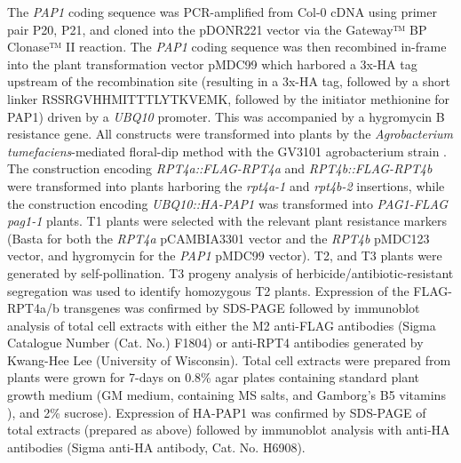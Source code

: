 The \textit{PAP1} coding sequence was PCR-amplified from Col-0 cDNA using primer pair P20, P21, and cloned into the pDONR221 vector via the Gateway™ BP Clonase™ II reaction. The \textit{PAP1} coding sequence was then recombined in-frame into the plant transformation vector pMDC99 which harbored a 3x-HA tag upstream of the recombination site (resulting in a 3x-HA tag, followed by a short linker RSSRGVHHMITTTLYTKVEMK, followed by the initiator methionine for PAP1) driven by a \textit{UBQ10} promoter. This was accompanied by a hygromycin B resistance gene. All constructs were transformed into plants by the \textit{Agrobacterium tumefaciens}-mediated floral-dip method with the GV3101 agrobacterium strain \citep{clough98, gelvin03, zhang06}. The construction encoding \textit{RPT4a::FLAG-RPT4a} and \textit{RPT4b::FLAG-RPT4b} were transformed into plants harboring the \textit{rpt4a-1} and \textit{rpt4b-2} insertions, while the construction encoding \textit{UBQ10::HA-PAP1} was transformed into \textit{PAG1-FLAG pag1-1} plants. T1 plants were selected with the relevant plant resistance markers (Basta for both the \textit{RPT4a} pCAMBIA3301 vector and the \textit{RPT4b} pMDC123 vector, and hygromycin for the \textit{PAP1} pMDC99 vector). T2, and T3 plants were generated by self-pollination. T3 progeny analysis of herbicide/antibiotic-resistant segregation was used to identify homozygous T2 plants. Expression of the FLAG-RPT4a/b transgenes was confirmed by SDS-PAGE followed by immunoblot analysis of total cell extracts with either the M2 anti-FLAG antibodies (Sigma Catalogue Number (Cat. No.) F1804) or anti-RPT4 antibodies generated by Kwang-Hee Lee (University of Wisconsin). Total cell extracts were prepared from plants were grown for 7-days on 0.8\% agar plates containing standard plant growth medium (GM medium, containing MS salts, and Gamborg’s B5 vitamins \citep{gamborg68, julio06, murashige62}), and 2\% sucrose). Expression of HA-PAP1 was confirmed by SDS-PAGE of total extracts (prepared as above) followed by immunoblot analysis with anti-HA antibodies (Sigma anti-HA antibody, Cat. No. H6908).
